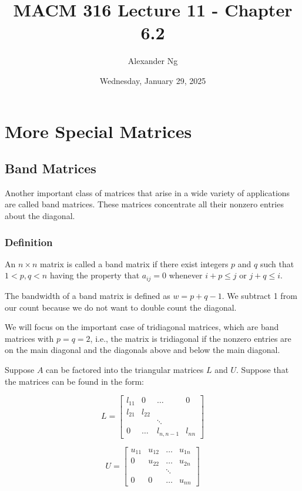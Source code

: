 \documentclass[12pt]{article}
\begin{document}
\renewcommand{\arraystretch}{1.25} %
\setlength{\arraycolsep}{12pt}

\title{MACM 316 Lecture 11 - Chapter 6.2}
\author{Alexander Ng}
\date{Wednesday, January 29, 2025}
\maketitle

\section{More Special Matrices}

\subsection{Band Matrices}
Another important class of matrices that arise in a wide variety of 
applications are called band matrices. These matrices concentrate all their 
nonzero entries about the diagonal.

\subsubsection{Definition}
An $n \times n$ matrix is called a band matrix if there exist integers $p$ and
$q$ such that $1 < p, q < n$ having the property that $a_{ij} = 0$ whenever
$i + p \leq j$ or $j + q \leq i$.

The bandwidth of a band matrix is defined as $w = p+q-1$. We subtract 1 from 
our count because we do not want to double count the diagonal.

We will focus on the important case of tridiagonal matrices, which are band 
matrices with $p = q = 2$, i.e., the matrix is tridiagonal if the nonzero 
entries are on the main diagonal and the diagonals above and below the main 
diagonal.

Suppose $A$ can be factored into the triangular matrices $L$ and $U$. Suppose
that the matrices can be found in the form:

\[
L = \begin{bmatrix}
    l_{11} & 0 & \dots & 0 \\
    l_{21} & l_{22} & & \\
    & & \ddots & \\
    0 & \dots & l_{n,n-1} & l_{nn}
\end{bmatrix}
\]

\[
U = \begin{bmatrix}
    u_{11} & u_{12} & \dots & u_{1n} \\
    0 & u_{22} & \dots & u_{2n} \\
    & & \ddots & \\
    0 & 0 & \dots & u_{nn}
\end{bmatrix}
\]
\end{document}
